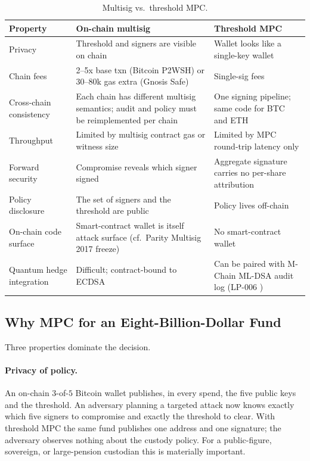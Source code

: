 \begin{table}[h]
\centering
\small
\begin{tabular}{p{4.5cm}p{5cm}p{5cm}}
\toprule
\textbf{Property} & \textbf{On-chain multisig} & \textbf{Threshold MPC} \\
\midrule
Privacy & Threshold and signers are visible on chain &
Wallet looks like a single-key wallet \\
Chain fees & 2--5x base txn (Bitcoin P2WSH) or 30--80k gas extra
            (Gnosis Safe) & Single-sig fees \\
Cross-chain consistency & Each chain has different multisig semantics;
audit and policy must be reimplemented per chain &
One signing pipeline; same code for BTC and ETH \\
Throughput & Limited by multisig contract gas or witness size &
Limited by MPC round-trip latency only \\
Forward security & Compromise reveals which signer signed &
Aggregate signature carries no per-share attribution \\
Policy disclosure & The set of signers and the threshold are public &
Policy lives off-chain \\
On-chain code surface & Smart-contract wallet is itself attack
surface (cf.\ Parity Multisig 2017 freeze) &
No smart-contract wallet \\
Quantum hedge integration & Difficult; contract-bound to ECDSA &
Can be paired with M-Chain ML-DSA audit log (LP-006 \cite{lp006}) \\
\bottomrule
\end{tabular}
\caption{Multisig vs.\ threshold MPC.}
\label{tab:mpc-vs-multisig}
\end{table}

\subsection{Why MPC for an Eight-Billion-Dollar Fund}

Three properties dominate the decision.

\paragraph{Privacy of policy.} An on-chain $3$-of-$5$ Bitcoin wallet
publishes, in every spend, the five public keys and the threshold.
An adversary planning a targeted attack now knows exactly which five
signers to compromise and exactly the threshold to clear. With
threshold MPC the same fund publishes one address and one signature;
the adversary observes nothing about the custody policy. For a
public-figure, sovereign, or large-pension custodian this is
materially important.

